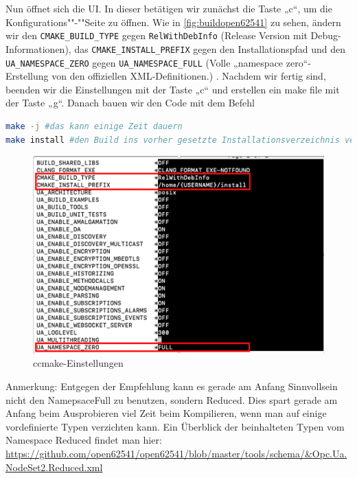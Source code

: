 Nun öffnet sich die UI. In dieser betätigen wir zunächst die Taste „c“, um die Konfigurations""-""Seite zu öffnen. Wie in \autoref{fig:buildopen62541} zu sehen, ändern wir den \lstinline|CMAKE_BUILD_TYPE| gegen \lstinline|RelWithDebInfo| (Release Version mit Debug-Informationen), das \lstinline|CMAKE_INSTALL_PREFIX|
gegen den Installationspfad und den \lstinline|UA_NAMESPACE_ZERO| gegen \lstinline|UA_NAMESPACE_FULL|  (Volle „namespace zero“-Erstellung von den offiziellen XML-Definitionen.) . Nachdem wir fertig sind, beenden wir die Einstellungen mit der Taste „c“ und erstellen ein make file mit der Taste „g“.
Danach bauen wir den Code mit dem Befehl
\begin{lstlisting}[language=Bash]
make -j #das kann einige Zeit dauern
make install #den Build ins vorher gesetzte Installationsverzeichnis verschieben
\end{lstlisting}
  
\begin{figure}[H]
	\centering
	\includegraphics[width=0.6\linewidth]{abb/Build_Open62541}
	\caption{ccmake-Einstellungen}
	\label{fig:buildopen62541}
\end{figure}

Anmerkung:
Entgegen der Empfehlung kann es gerade am Anfang Sinnvollsein nicht den NamepsaceFull zu benutzen, sondern Reduced. Dies spart gerade am Anfang beim Ausprobieren viel Zeit beim Kompilieren, wenn man auf einige vordefinierte Typen verzichten kann.
Ein Überblick der beinhalteten Typen vom Namespace Reduced findet man hier:
\url{https://github.com/open62541/open62541/blob/master/tools/schema/&Opc.Ua.NodeSet2.Reduced.xml}

